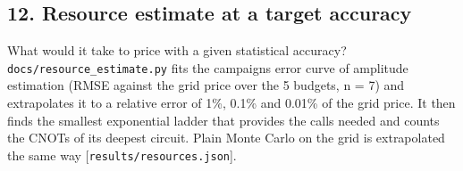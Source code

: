 \documentclass[
  10pt,
]{article}
\begin{document}
\hypertarget{12-resource-estimate-at-a-target-accuracy}{%
\subsection{12. Resource estimate at a target
accuracy}\label{12-resource-estimate-at-a-target-accuracy}}

What would it take to price with a given statistical accuracy?
\texttt{docs/resource\_estimate.py} fits the campaign\textquotesingle s
error curve of amplitude estimation (RMSE against the grid price over
the 5 budgets, n = 7) and extrapolates it to a relative error of 1\%,
0.1\% and 0.01\% of the grid price. It then finds the smallest
exponential ladder that provides the calls needed and counts the CNOTs
of its deepest circuit. Plain Monte Carlo on the grid is extrapolated
the same way {[}\texttt{results/resources.json}{]}.
\end{document}
